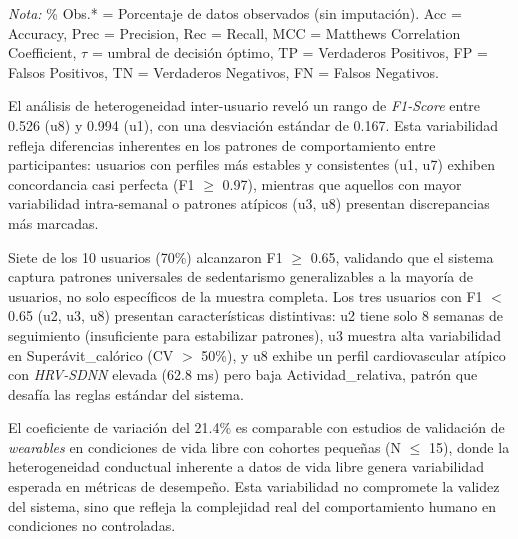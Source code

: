 \begin{flushleft}
\small
\textit{Nota:} \% Obs.* = Porcentaje de datos observados (sin imputación). Acc = Accuracy, Prec = Precision, Rec = Recall, MCC = Matthews Correlation Coefficient, $\tau$ = umbral de decisión óptimo, TP = Verdaderos Positivos, FP = Falsos Positivos, TN = Verdaderos Negativos, FN = Falsos Negativos.
\end{flushleft}

El análisis de heterogeneidad inter-usuario reveló un rango de \textit{F1-Score} entre 0.526 (u8) y 0.994 (u1), con una desviación estándar de 0.167. Esta variabilidad refleja diferencias inherentes en los patrones de comportamiento entre participantes: usuarios con perfiles más estables y consistentes (u1, u7) exhiben concordancia casi perfecta (F1 $\geq$ 0.97), mientras que aquellos con mayor variabilidad intra-semanal o patrones atípicos (u3, u8) presentan discrepancias más marcadas.

Siete de los 10 usuarios (70\%) alcanzaron F1 $\geq$ 0.65, validando que el sistema captura patrones universales de sedentarismo generalizables a la mayoría de usuarios, no solo específicos de la muestra completa. Los tres usuarios con F1 $<$ 0.65 (u2, u3, u8) presentan características distintivas: u2 tiene solo 8 semanas de seguimiento (insuficiente para estabilizar patrones), u3 muestra alta variabilidad en Superávit\_calórico (CV $>$ 50\%), y u8 exhibe un perfil cardiovascular atípico con \textit{HRV-SDNN} elevada (62.8 ms) pero baja Actividad\_relativa, patrón que desafía las reglas estándar del sistema.

El coeficiente de variación del 21.4\% es comparable con estudios de validación de \textit{wearables} en condiciones de vida libre con cohortes pequeñas (N $\leq$ 15), donde la heterogeneidad conductual inherente a datos de vida libre genera variabilidad esperada en métricas de desempeño. Esta variabilidad no compromete la validez del sistema, sino que refleja la complejidad real del comportamiento humano en condiciones no controladas.

